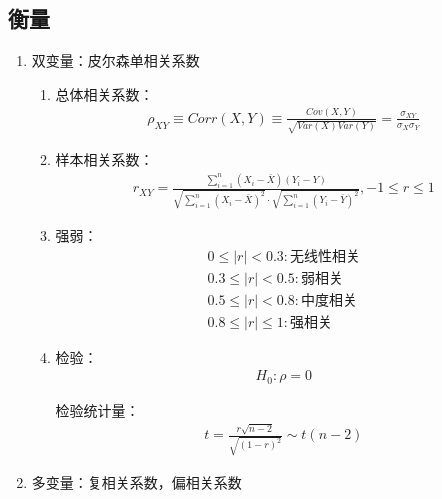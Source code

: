\documentclass[12pt]{book}
\begin{document}
\subsection{衡量}


\begin{enumerate}[1.]
    \item 双变量：皮尔森单相关系数
          \begin{enumerate}[(1)]
              \item 总体相关系数：
                    \begin{gather*}
                        \rho_{XY}\equiv Corr\left(X,Y\right)\equiv\frac{Cov\left(X,Y\right)}{\sqrt{Var\left(X\right)Var\left(Y\right)}}
                        =\frac{\sigma_{XY}}{\sigma_X\sigma_Y}
                    \end{gather*}
              \item 样本相关系数：
                    \begin{gather*}
                        r_{XY} = \frac{\sum_{i=1}^{n}{ (X_i-\bar{X})(Y_i-Y)}}{\sqrt{\sum_{i=1}^{n}{(X_i-\bar{X})^2}}\cdot \sqrt{\sum_{i=1}^{n}{(Y_i-\bar{Y})^2}}  }, -1\leq r \leq 1
                    \end{gather*}
              \item 强弱：
                    \begin{align*}
                        0\le\left|r\right|<0.3:\text{无线性相关} \\
                        0.3\le\left|r\right|<0.5:\text{弱相关}   \\
                        0.5\le\left|r\right|<0.8:\text{中度相关} \\
                        0.8\le\left|r\right|\le1:\text{强相关}
                    \end{align*}
              \item 检验：
                    \begin{gather*}
                        H_0: \rho =0
                    \end{gather*}
                    \par 检验统计量：
                    \begin{gather*}
                        t = \frac{r\sqrt{n-2}}{\sqrt{(1-r)^2}} \sim t(n-2)
                    \end{gather*}
          \end{enumerate}
    \item 多变量：复相关系数，偏相关系数
\end{enumerate}
\end{document}
